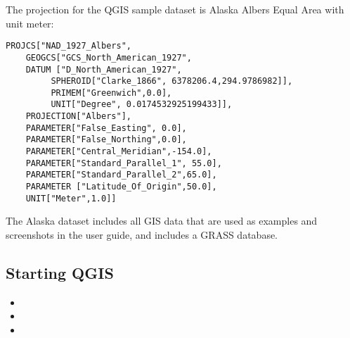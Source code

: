 The projection 
for the QGIS sample dataset is Alaska Albers Equal Area with unit meter:

\begin{verbatim}
PROJCS["NAD_1927_Albers",
    GEOGCS["GCS_North_American_1927",
	DATUM ["D_North_American_1927",
	     SPHEROID["Clarke_1866", 6378206.4,294.9786982]],
	     PRIMEM["Greenwich",0.0],
	     UNIT["Degree", 0.0174532925199433]],
    PROJECTION["Albers"],
    PARAMETER["False_Easting", 0.0],
    PARAMETER["False_Northing",0.0],
    PARAMETER["Central_Meridian",-154.0],
    PARAMETER["Standard_Parallel_1", 55.0],
    PARAMETER["Standard_Parallel_2",65.0],
    PARAMETER ["Latitude_Of_Origin",50.0],
    UNIT["Meter",1.0]]
\end{verbatim}
The Alaska dataset includes all GIS data that are used as examples and 
screenshots in the user guide, and includes a GRASS database.

%

\subsection{Starting QGIS}\label{label_startinqgis}

\begin{itemize}
\item {} 
\item {}
\item {}
\end{itemize} 

